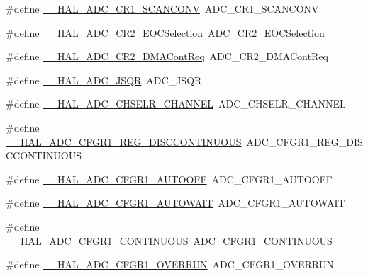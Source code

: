 \begin{DoxyCompactItemize}
\item 
\#define \hyperlink{group___h_a_l___a_d_c___aliased___macros_ga92d473f3afb5552b6e4a710410fcb2f1}{\+\_\+\+\_\+\+H\+A\+L\+\_\+\+A\+D\+C\+\_\+\+C\+R1\+\_\+\+S\+C\+A\+N\+C\+O\+NV}~A\+D\+C\+\_\+\+C\+R1\+\_\+\+S\+C\+A\+N\+C\+O\+NV
\item 
\#define \hyperlink{group___h_a_l___a_d_c___aliased___macros_gafb4baec5d5d5ebf891a3cd8a9a0bfe65}{\+\_\+\+\_\+\+H\+A\+L\+\_\+\+A\+D\+C\+\_\+\+C\+R2\+\_\+\+E\+O\+C\+Selection}~A\+D\+C\+\_\+\+C\+R2\+\_\+\+E\+O\+C\+Selection
\item 
\#define \hyperlink{group___h_a_l___a_d_c___aliased___macros_gaedcab24fbd762b1f6b65c7381f910308}{\+\_\+\+\_\+\+H\+A\+L\+\_\+\+A\+D\+C\+\_\+\+C\+R2\+\_\+\+D\+M\+A\+Cont\+Req}~A\+D\+C\+\_\+\+C\+R2\+\_\+\+D\+M\+A\+Cont\+Req
\item 
\#define \hyperlink{group___h_a_l___a_d_c___aliased___macros_ga920c922d2385fcaab11b2ca7c8630da8}{\+\_\+\+\_\+\+H\+A\+L\+\_\+\+A\+D\+C\+\_\+\+J\+S\+QR}~A\+D\+C\+\_\+\+J\+S\+QR
\item 
\#define \hyperlink{group___h_a_l___a_d_c___aliased___macros_gae5547f083abe059cacdcaac3e5066ea2}{\+\_\+\+\_\+\+H\+A\+L\+\_\+\+A\+D\+C\+\_\+\+C\+H\+S\+E\+L\+R\+\_\+\+C\+H\+A\+N\+N\+EL}~A\+D\+C\+\_\+\+C\+H\+S\+E\+L\+R\+\_\+\+C\+H\+A\+N\+N\+EL
\item 
\#define \hyperlink{group___h_a_l___a_d_c___aliased___macros_ga3703e313dbcb2af3dea5a07d622e67c6}{\+\_\+\+\_\+\+H\+A\+L\+\_\+\+A\+D\+C\+\_\+\+C\+F\+G\+R1\+\_\+\+R\+E\+G\+\_\+\+D\+I\+S\+C\+C\+O\+N\+T\+I\+N\+U\+O\+US}~A\+D\+C\+\_\+\+C\+F\+G\+R1\+\_\+\+R\+E\+G\+\_\+\+D\+I\+S\+C\+C\+O\+N\+T\+I\+N\+U\+O\+US
\item 
\#define \hyperlink{group___h_a_l___a_d_c___aliased___macros_gab767937348c3e3b3c22e7316e42004c1}{\+\_\+\+\_\+\+H\+A\+L\+\_\+\+A\+D\+C\+\_\+\+C\+F\+G\+R1\+\_\+\+A\+U\+T\+O\+O\+FF}~A\+D\+C\+\_\+\+C\+F\+G\+R1\+\_\+\+A\+U\+T\+O\+O\+FF
\item 
\#define \hyperlink{group___h_a_l___a_d_c___aliased___macros_ga400e3c69f55dad73669df7ce10297066}{\+\_\+\+\_\+\+H\+A\+L\+\_\+\+A\+D\+C\+\_\+\+C\+F\+G\+R1\+\_\+\+A\+U\+T\+O\+W\+A\+IT}~A\+D\+C\+\_\+\+C\+F\+G\+R1\+\_\+\+A\+U\+T\+O\+W\+A\+IT
\item 
\#define \hyperlink{group___h_a_l___a_d_c___aliased___macros_ga6e3bc5992840ed200085c9b3ba68d7d2}{\+\_\+\+\_\+\+H\+A\+L\+\_\+\+A\+D\+C\+\_\+\+C\+F\+G\+R1\+\_\+\+C\+O\+N\+T\+I\+N\+U\+O\+US}~A\+D\+C\+\_\+\+C\+F\+G\+R1\+\_\+\+C\+O\+N\+T\+I\+N\+U\+O\+US
\item 
\#define \hyperlink{group___h_a_l___a_d_c___aliased___macros_ga60d5ad7e386833338f43e293120fd20a}{\+\_\+\+\_\+\+H\+A\+L\+\_\+\+A\+D\+C\+\_\+\+C\+F\+G\+R1\+\_\+\+O\+V\+E\+R\+R\+UN}~A\+D\+C\+\_\+\+C\+F\+G\+R1\+\_\+\+O\+V\+E\+R\+R\+UN

\end{DoxyCompactItemize}
